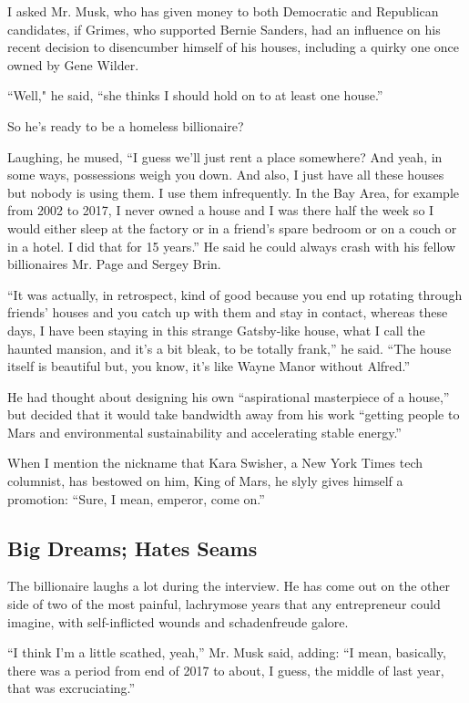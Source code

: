 I asked Mr. Musk, who has given money to both Democratic and Republican
candidates, if Grimes, who supported Bernie Sanders, had an influence on
his recent decision to disencumber himself of his houses, including a
quirky one once owned by Gene Wilder.

``Well," he said, ``she thinks I should hold on to at least one house.''

So he's ready to be a homeless billionaire?

Laughing, he mused, ``I guess we'll just rent a place somewhere? And
yeah, in some ways, possessions weigh you down. And also, I just have
all these houses but nobody is using them. I use them infrequently. In
the Bay Area, for example from 2002 to 2017, I never owned a house and I
was there half the week so I would either sleep at the factory or in a
friend's spare bedroom or on a couch or in a hotel. I did that for 15
years.'' He said he could always crash with his fellow billionaires Mr.
Page and Sergey Brin.

``It was actually, in retrospect, kind of good because you end up
rotating through friends' houses and you catch up with them and stay in
contact, whereas these days, I have been staying in this strange
Gatsby-like house, what I call the haunted mansion, and it's a bit
bleak, to be totally frank,'' he said. ``The house itself is beautiful
but, you know, it's like Wayne Manor without Alfred.''

He had thought about designing his own ``aspirational masterpiece of a
house,'' but decided that it would take bandwidth away from his work
``getting people to Mars and environmental sustainability and
accelerating stable energy.''

When I mention the nickname that Kara Swisher, a New York Times tech
columnist, has bestowed on him, King of Mars, he slyly gives himself a
promotion: ``Sure, I mean, emperor, come on.''

\hypertarget{big-dreams-hates-seams}{%
\subsection{Big Dreams; Hates Seams}\label{big-dreams-hates-seams}}

The billionaire laughs a lot during the interview. He has come out on
the other side of two of the most painful, lachrymose years that any
entrepreneur could imagine, with self-inflicted wounds and schadenfreude
galore.

``I think I'm a little scathed, yeah,'' Mr. Musk said, adding: ``I mean,
basically, there was a period from end of 2017 to about, I guess, the
middle of last year, that was excruciating.''

